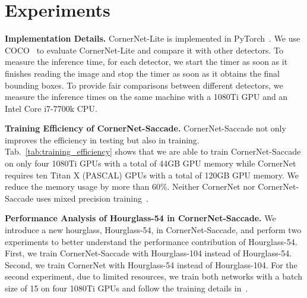 \documentclass{bmvc2k}
\begin{document}
\section{Experiments}
\smallskip \noindent \textbf{Implementation Details.} CornerNet-Lite is implemented in PyTorch~\cite{paszke2017automatic}. We use COCO~\cite{lin2014microsoft} to evaluate CornerNet-Lite and compare it with other detectors. To measure the inference time, for each detector, we start the timer as soon as it finishes reading the image and stop the timer as soon as it obtains the final bounding boxes. To provide fair comparisons between different detectors, we measure the inference times on the same machine with a 1080Ti GPU and an Intel Core i7-7700k CPU.

\begin{table}[h]
    \centering
    \caption{CornerNet-Saccade saves more than 60\% GPU memory and requires only 4 GPUs to train, while it outperforms CornerNet.}
    \label{tab:training_efficiency}
    \vspace{-3mm}
\end{table}

\smallskip \noindent \textbf{Training Efficiency of CornerNet-Saccade.} CornerNet-Saccade not only improves the efficiency in testing but also in training. Tab.~\ref{tab:training_efficiency} shows that we are able to train CornerNet-Saccade on only four 1080Ti GPUs with a total of 44GB GPU memory while CornerNet requires ten Titan X (PASCAL) GPUs with a total of 120GB GPU memory. We reduce the memory usage by more than 60\%. Neither CornerNet nor CornerNet-Saccade uses mixed precision training~\cite{micikevicius2017mixed}.

\smallskip \noindent \textbf{Performance Analysis of Hourglass-54 in CornerNet-Saccade.} We introduce a new hourglass, Hourglass-54, in CornerNet-Saccade, and perform two experiments to better understand the performance contribution of Hourglass-54. First, we train CornerNet-Saccade with Hourglass-104 instead of Hourglass-54. Second, we train CornerNet with Hourglass-54 instead of Hourglass-104. For the second experiment, due to limited resources, we train both networks with a batch size of 15 on four 1080Ti GPUs and follow the training details in~\cite{law2018cornernet}. 
\end{document}
